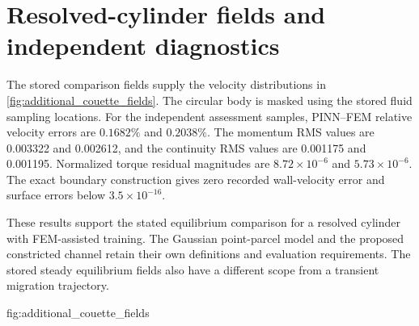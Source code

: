 \section{Resolved-cylinder fields and independent diagnostics}
The stored comparison fields supply the velocity distributions in
\cref{fig:additional_couette_fields}. The circular body is masked using
the stored fluid sampling locations. For the independent assessment
samples, PINN--FEM relative velocity errors are $0.1682\%$ and
$0.2038\%$. The momentum RMS values are 0.003322 and 0.002612, and
the continuity RMS values are 0.001175 and 0.001195. Normalized torque
residual magnitudes are $8.72\times10^{-6}$ and $5.73\times10^{-6}$.
The exact boundary construction gives zero recorded wall-velocity error
and surface errors below $3.5\times10^{-16}$.

These results support the stated equilibrium comparison for a resolved
cylinder with FEM-assisted training. The Gaussian point-parcel model
and the proposed constricted channel retain their own definitions and
evaluation requirements. The stored steady equilibrium fields also
have a different scope from a transient migration trajectory.

{fig:additional_couette_fields}
\FloatBarrier
